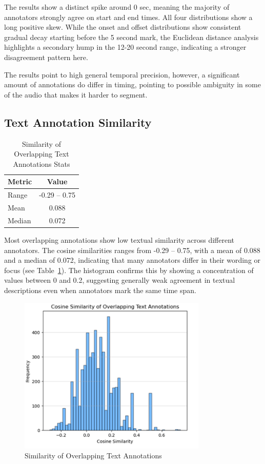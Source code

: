 \documentclass{article}
\begin{document}
The results show a distinct spike around 0 sec, meaning the majority of annotators strongly agree on start and end times. All four distributions show a long positive skew. While the onset and offset distributions show consistent gradual decay starting before the 5 second mark, the Euclidean distance analysis highlights a secondary hump in the 12-20 second range, indicating a stronger disagreement pattern here.

The results point to high general temporal precision, however, a significant amount of annotations do differ in timing, pointing to possible ambiguity in some of the audio that makes it harder to segment.

\subsection{Text Annotation Similarity}

\begin{table}[H]
  \caption{Similarity of Overlapping Text Annotations Stats}
  \label{tab:text_similarity}
  \centering
  \begin{tabular}{lc}
    \toprule
    Metric & Value \\
    \midrule
    Range & -0.29 -- 0.75 \\
    Mean & 0.088 \\
    Median & 0.072 \\
    \bottomrule
  \end{tabular}
\end{table}

Most overlapping annotations show low textual similarity across different annotators. The cosine similarities ranges from -0.29 -- 0.75, with a mean of 0.088 and a median of 0.072, indicating that many annotators differ in their wording or focus (see Table~\ref{tab:text_similarity}). The histogram confirms this by showing a concentration of values between 0 and 0.2, suggesting generally weak agreement in textual descriptions even when annotators mark the same time span.

\begin{figure}[H]
  \centering
  \includegraphics[width=0.8\textwidth]{figures/annotation_quality/similarity_of_overlapping_text_annotations.png}
  \caption{Similarity of Overlapping Text Annotations}
  \label{fig:text_similarity}
\end{figure}
\end{document}
